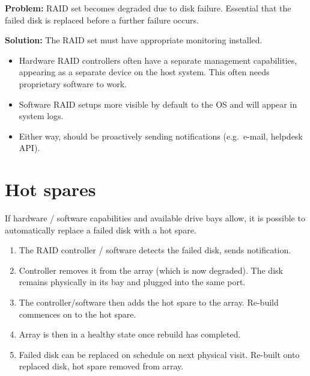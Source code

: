 \documentclass[slides]{pgnotes}
\begin{document}
\textbf{Problem:} RAID set becomes degraded due to disk failure.
Essential that the failed disk is replaced before a further failure
occurs.

\textbf{Solution:} The RAID set must have appropriate monitoring
installed.

\begin{itemize}
\item
  Hardware RAID controllers often have a separate management
  capabilities, appearing as a separate device on the host system. This
  often needs proprietary software to work.
\item
  Software RAID setups more visible by default to the OS and will appear
  in system logs.
\item
  Either way, should be proactively sending notifications (e.g.~e-mail,
  helpdesk API).
\end{itemize}

\section{Hot spares}
\label{sec:hot-spares}

If hardware / software capabilities and available drive bays allow, it
is possible to automatically replace a failed disk with a hot spare.

\begin{enumerate}
\item
  The RAID controller / software detects the failed disk, sends
  notification.
\item
  Controller removes it from the array (which is now degraded). The disk
  remains physically in its bay and plugged into the same port.
\item
  The controller/software then adds the hot spare to the array. Re-build
  commences on to the hot spare.
\item
  Array is then in a healthy state once rebuild has completed.
\item
  Failed disk can be replaced on schedule on next physical visit.
  Re-built onto replaced disk, hot spare removed from array.
\end{enumerate}
\end{document}
